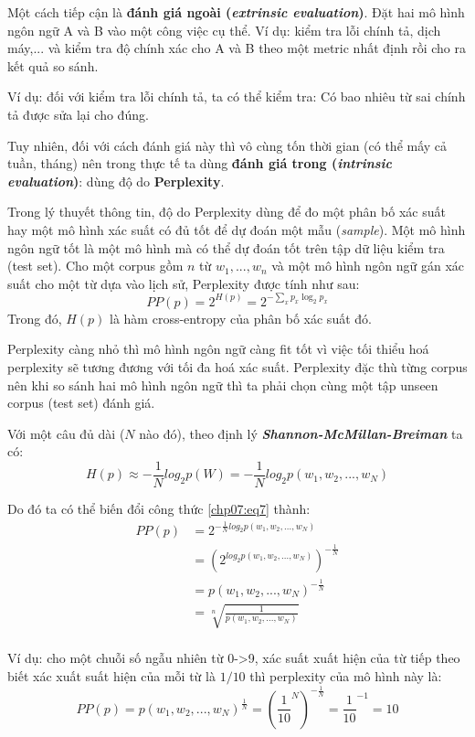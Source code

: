 Một cách tiếp cận là \textbf{đánh giá ngoài (\textit{extrinsic evaluation})}. Đặt hai mô hình ngôn ngữ A và B vào một công việc cụ thể. Ví dụ: kiểm tra lỗi chính tả, dịch máy,... và kiểm tra độ chính xác cho A và B theo một metric nhất định rồi cho ra kết quả so sánh.

Ví dụ: đối với kiểm tra lỗi chính tả, ta có thể kiểm tra: Có bao nhiêu từ sai chính tả được sửa lại cho đúng.

Tuy nhiên, đối với cách đánh giá này thì vô cùng tốn thời gian (có thể mấy cả tuần, tháng) nên trong thực tế ta dùng \textbf{đánh giá trong (\textit{intrinsic evaluation})}: dùng độ do \textbf{Perplexity}.

Trong lý thuyết thông tin, độ do Perplexity dùng để đo một phân bố xác suất hay một mô hình xác suất có đủ tốt để dự đoán một mẫu (\textit{sample}). Một mô hình ngôn ngữ tốt là một mô hình mà có thể dự đoán tốt trên tập dữ liệu kiểm tra (test set). Cho một corpus gồm $n$ từ $w_1,...,w_n$ và một mô hình ngôn ngữ gán xác suất cho một từ dựa vào lịch sử, Perplexity được tính như sau:
\begin{equation}
\label{chp07:eq7}
PP(p)=2^{H(p)}=2^{-\sum_{x}^{}p_x\log_2p_x}
\end{equation}
Trong đó, $H(p)$ là hàm cross-entropy của phân bố xác suất đó.

Perplexity càng nhỏ thì mô hình ngôn ngữ càng fit tốt vì việc tối thiểu hoá perplexity sẽ tương đương với tối đa hoá xác suất. Perplexity đặc thù từng corpus nên khi so sánh hai mô hình ngôn ngữ thì ta phải chọn cùng một tập unseen corpus (test set) đánh giá. 

Với một câu đủ dài ($N$ nào đó), theo định lý \textbf{\textit{Shannon-McMillan-Breiman}} ta có:
$$H(p)\approx-\frac{1}{N}log_2p(W)=-\frac{1}{N}log_2p(w_1,w_2,...,w_N)$$

Do đó ta có thể biến đổi công thức \ref{chp07:eq7} thành: 
\begin{equation} 
\begin{split}
PP(p)&=2^{-\frac{1}{N}log_2p(w_1,w_2,...,w_N)}\\
&=(2^{log_2p(w_1,w_2,...,w_N)})^{-\frac{1}{N}}\\
&=p(w_1,w_2,...,w_N)^{-\frac{1}{N}}\\
&=  \sqrt[n]{\frac{1}{p(w_1,w_2,...,w_N)}}\\
\end{split}
\end{equation}

Ví dụ: cho một chuỗi số ngẫu nhiên từ 0->9, xác suất xuất hiện của từ tiếp theo biết xác xuất suất hiện của mỗi từ là $1/10$ thì perplexity của mô hình này là:
$$PP(p)=p(w_1,w_2,...,w_N)^{\frac{1}{N}}=(\frac{1}{10}^N)^{-\frac{1}{N}}=\frac{1}{10}^{-1}=10$$

